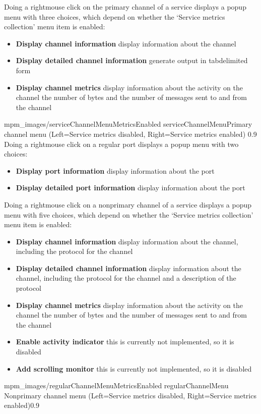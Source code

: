 Doing a right\longDash{}mouse click on the primary channel of a service displays a popup
menu with three choices, which depend on whether the `Service metrics collection' menu
item is enabled:
\begin{itemize}
\item\textbf{Display channel information} display information about the channel
\item\exSp\textbf{Display detailed channel information} generate output in
tab\longDash{}delimited form
\item\exSp\textbf{Display channel metrics} display information about the activity on the
channel \longDash{} the number of bytes and the number of messages sent to and from the
channel
\end{itemize}
%
{mpm_images/serviceChannelMenuMetricsEnabled}%
{serviceChannelMenu}{Primary channel menu (Left=Service metrics disabled, Right=Service
metrics enabled)}%
{0.9}
\clearpage
Doing a right\longDash{}mouse click on a regular port displays a popup menu with two
choices:
\begin{itemize}
\item\textbf{Display port information} display information about the port
\item\exSp\textbf{Display detailed port information} display information about the port
\end{itemize}

Doing a right\longDash{}mouse click on a non\longDash{}primary channel of a service
displays a popup menu with five choices, which depend on whether the `Service metrics
collection' menu item is enabled:
\begin{itemize}
\item\textbf{Display channel information} display information about the channel,
including the protocol for the channel
\item\exSp\textbf{Display detailed channel information} display information about the
channel, including the protocol for the channel and a description of the protocol
\item\exSp\textbf{Display channel metrics} display information about the activity on the
channel \longDash{} the number of bytes and the number of messages sent to and from the
channel
\item\exSp\textbf{Enable activity indicator} \longDash{} this is currently not
implemented, so it is disabled
\item\exSp\textbf{Add scrolling monitor} \longDash{} this is currently not implemented, so
it is disabled
\end{itemize}
%
{mpm_images/regularChannelMenuMetricsEnabled}%
{regularChannelMenu}%
{Non\longDash{}primary channel menu (Left=Service metrics disabled, Right=Service metrics
enabled)}{0.9}

